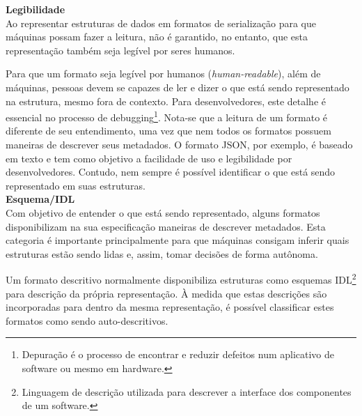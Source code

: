 \textbf{Legibilidade} \\

Ao representar estruturas de dados em formatos de serialização para que máquinas possam fazer a leitura, não é garantido, no entanto, que esta representação também seja legível por seres humanos.

Para que um formato seja legível por humanos (\textit{human-readable}), além de máquinas, pessoas devem se capazes de ler e dizer o que está sendo representado na estrutura, mesmo fora de contexto. Para desenvolvedores, este detalhe é essencial no processo de debugging\footnote{
  Depuração é o processo de encontrar e reduzir defeitos num aplicativo de software ou mesmo em hardware.
}. Nota-se que a leitura de um formato é diferente de seu entendimento, uma vez que nem todos os formatos possuem maneiras de descrever seus metadados. O formato JSON, por exemplo, é baseado em texto e tem como objetivo a facilidade de uso e legibilidade por desenvolvedores. Contudo, nem sempre é possível identificar o que está sendo representado em suas estruturas. \cite{SumarayMakki2012} \\

\textbf{Esquema/IDL} \\

Com objetivo de entender o que está sendo representado, alguns formatos disponibilizam na sua especificação maneiras de descrever metadados. Esta categoria é importante principalmente para que máquinas consigam inferir quais estruturas estão sendo lidas e, assim, tomar decisões de forma autônoma.

Um formato descritivo normalmente disponibiliza estruturas como esquemas IDL\footnote{
  Linguagem de descrição utilizada para descrever a interface dos componentes de um software.
} para descrição da própria representação. À medida que estas descrições são incorporadas para dentro da mesma representação, é possível classificar estes formatos como sendo auto-descritivos. \cite{Rentachintala2014}

